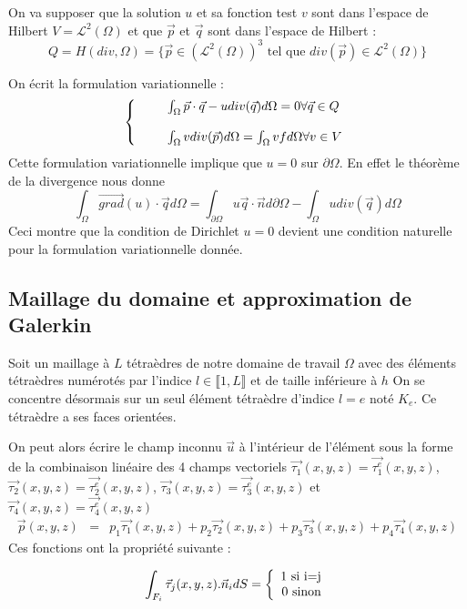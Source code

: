 \documentclass[a4paper,12pt]{article}
\begin{document}
On va supposer que la solution $u$ et sa fonction test $v$ sont dans l'espace de Hilbert $V=\mathcal{L}^{2}(\Omega)$ 
et que $\vec{p}$ et $\vec{q}$ sont dans l'espace de Hilbert :
\[
Q = H(div, \Omega) = 
\{ \vec{p} \in (\mathcal{L}^{2}(\Omega))^{3} \text{ tel que }
div(\vec{p}) \in \mathcal{L}^{2}(\Omega)
\}
\]

On écrit la formulation variationnelle :
\[
\left\{
\begin{array}{r c l}
&&\int_{\Omega} {\vec{p}\cdot\vec{q} - u div(\vec{q}) d\Omega} = 0 \forall \vec{q} \in Q \\
\\
&&\int_{\Omega} {v div(\vec{p}) d\Omega} = \int_{\Omega} {v f d\Omega} \forall v \in V 
\end{array}
\right.
\]
Cette formulation variationnelle implique que $u=0$ sur $\partial \Omega$. En effet le théorème de la divergence nous donne
\[
\int_{\Omega} {\vec{grad}(u)\cdot\vec{q}  d\Omega} = \int_{\partial \Omega} {u \vec{q} \cdot \vec{n}  d\partial\Omega} -
\int_{\Omega} {u div(\vec{q}) d\Omega}
\]
Ceci montre que la condition de Dirichlet $u=0$ devient une condition naturelle pour la formulation variationnelle donnée.
\subsection{Maillage du domaine et approximation de Galerkin}
Soit un maillage à $L$ tétraèdres de notre domaine de travail $\Omega$ avec des éléments tétraèdres numérotés par l'indice $l \in \llbracket 1,L \rrbracket$ et de taille inférieure à $h$
On se concentre désormais sur un seul élément tétraèdre d'indice $l=e$ 
noté $K_{e}$.
Ce tétraèdre a ses faces orientées.

On peut alors écrire le champ inconnu $\vec{u}$ à l'intérieur de l'élément sous la forme de la combinaison 
linéaire des 4 champs vectoriels $\vec{\tau_{1}}(x,y,z)=\vec{\tau_{1}^{e}}(x,y,z)$, $\vec{\tau_{2}}(x,y,z)=\vec{\tau_{2}^{e}}(x,y,z)$,
$\vec{\tau_{3}}(x,y,z)=\vec{\tau_{3}^{e}}(x,y,z)$ et $\vec{\tau_{4}}(x,y,z)=\vec{\tau_{4}^{e}}(x,y,z)$
\begin{eqnarray*}
\vec{p}(x,y,z) &=& p_{1} \vec{\tau_{1}}(x,y,z) + p_{2} \vec{\tau_{2}}(x,y,z) + p_{3} \vec{\tau_{3}}(x,y,z) + p_{4} \vec{\tau_{4}}(x,y,z)
\end{eqnarray*}
Ces fonctions ont la propriété suivante :

\[
  \int_{F_{i}} {\vec{\tau}_{j}(x,y,z).\vec{n}_{i} dS} = 
  \left\{
  \begin{array}{r c l}
  \text{1 si i=j}\\
  \text{0 sinon}
  \end{array}
  \right.
\]
\end{document}
